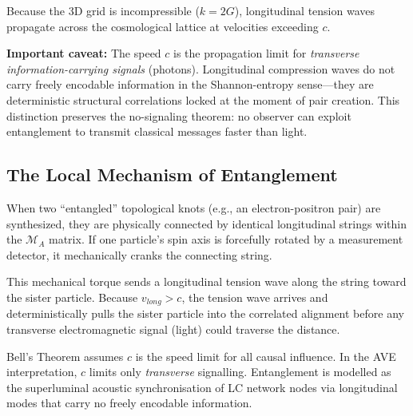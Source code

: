 Because the 3D grid is incompressible ($k = 2G$), longitudinal tension waves propagate across the cosmological lattice at velocities exceeding $c$. 

\textbf{Important caveat:} The speed $c$ is the propagation limit for \textit{transverse information-carrying signals} (photons). Longitudinal compression waves do not carry freely encodable information in the Shannon-entropy sense---they are deterministic structural correlations locked at the moment of pair creation. This distinction preserves the no-signaling theorem: no observer can exploit entanglement to transmit classical messages faster than light.

\subsection{The Local Mechanism of Entanglement}
When two ``entangled'' topological knots (e.g., an electron-positron pair) are synthesized, they are physically connected by identical longitudinal strings within the $\mathcal{M}_A$ matrix. If one particle's spin axis is forcefully rotated by a measurement detector, it mechanically cranks the connecting string. 

This mechanical torque sends a longitudinal tension wave along the string toward the sister particle. Because $v_{long} > c$, the tension wave arrives and deterministically pulls the sister particle into the correlated alignment before any transverse electromagnetic signal (light) could traverse the distance.

Bell's Theorem assumes $c$ is the speed limit for all causal influence. In the AVE interpretation, $c$ limits only \textit{transverse} signalling. Entanglement is modelled as the superluminal acoustic synchronisation of LC network nodes via longitudinal modes that carry no freely encodable information.